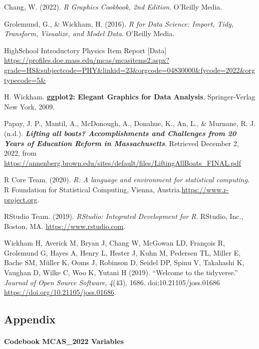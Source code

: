 \documentclass[
  letterpaper,
  DIV=11,
  numbers=noendperiod]{scrartcl}
\let\oldparagraph\paragraph
\renewcommand{\paragraph}[1]{\oldparagraph{#1}\mbox{}}
\newlength{\cslhangindent}
\newlength{\cslentryspacingunit} %
\newenvironment{CSLReferences}[2] %
 {%
  \setlength{\parindent}{0pt}
  \ifodd #1
  \let\oldpar\par
  \def\par{\hangindent=\cslhangindent\oldpar}
  \fi
  \setlength{\parskip}{#2\cslentryspacingunit}
 }%
 {}
\begin{document}
\leavevmode{}%
\begin{CSLReferences}{0}{0}
Chang, W. (2022). \emph{R Graphics Cookbook, 2nd Edition}. O'Reilly
Media.

Grolemund, G., \& Wickham, H. (2016). \emph{R for Data Science: Import,
Tidy, Transform, Visualize, and Model Data}. O'Reilly Media.

HighSchool Introductory Physics Item Report {[}Data{]}
\url{https://profiles.doe.mass.edu/mcas/mcasitems2.aspx?grade=HS\&subjectcode=PHY\&linkid=23\&orgcode=04830000\&fycode=2022\&orgtypecode=5\&}

H. Wickham. \textbf{ggplot2: Elegant Graphics for Data Analysis}.
Springer-Verlag New York, 2009.

Papay, J. P., Mantil, A., McDonough, A., Donahue, K., An, L., \&
Murnane, R. J. (n.d.). \textbf{\emph{Lifting all boats? Accomplishments
and Challenges from 20 Years of Education Reform in Massachusetts}}.
Retrieved December 2, 2022, from
\url{https://annenberg.brown.edu/sites/default/files/LiftingAllBoats_FINAL.pdf}

R Core Team. (2020). \emph{R: A language and environment for statistical
computing}. R Foundation for Statistical Computing, Vienna,
Austria.\url{https://www.r-project.org}.

RStudio Team. (2019). \emph{RStudio: Integrated Development for R}.
RStudio, Inc., Boston, MA. \url{https://www.rstudio.com}.

Wickham H, Averick M, Bryan J, Chang W, McGowan LD, François R,
Grolemund G, Hayes A, Henry L, Hester J, Kuhn M, Pedersen TL, Miller E,
Bache SM, Müller K, Ooms J, Robinson D, Seidel DP, Spinu V, Takahashi K,
Vaughan D, Wilke C, Woo K, Yutani H (2019). ``Welcome to the
tidyverse.'' \emph{Journal of Open Source Software}, \emph{4}(43), 1686.
doi:10.21105/joss.01686 \url{https://doi.org/10.21105/joss.01686}.

\end{CSLReferences}

\hypertarget{appendix}{%
\subsection{Appendix}\label{appendix}}

\hypertarget{codebook-mcas_2022-variables}{%
\paragraph{Codebook MCAS\_2022
Variables}\label{codebook-mcas_2022-variables}}
\end{document}
